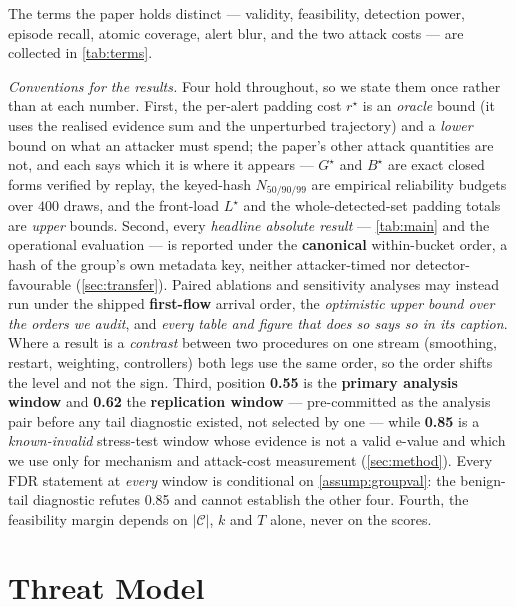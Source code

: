 \documentclass[conference]{IEEEtran}
\newcommand{\Cal}{\mathcal{C}}
\newcommand{\nCal}{\lvert\Cal\rvert}
\newcommand{\FDR}{\mathrm{FDR}}
\begin{document}
The terms the paper holds distinct --- validity, feasibility, detection power, episode
recall, atomic coverage, alert blur, and the two attack costs --- are collected in \cref{tab:terms}.

\emph{Conventions for the results.} Four hold throughout, so we state them once rather than at each
number. First, the per-alert padding cost $r^{\star}$ is an \emph{oracle} bound (it uses the realised
evidence sum and the unperturbed trajectory) and a \emph{lower} bound on what an attacker must spend;
the paper's other attack quantities are not, and each says which it is where it appears --- $G^{\star}$
and $B^{\star}$ are exact closed forms verified by replay, the keyed-hash $N_{50/90/99}$ are empirical
reliability budgets over $400$ draws, and the front-load $L^{\star}$ and the whole-detected-set padding
totals are \emph{upper} bounds. Second, every \emph{headline
absolute result} --- \cref{tab:main} and the operational evaluation --- is reported under the
\textbf{canonical} within-bucket order, a hash of the group's own metadata key, neither attacker-timed
nor detector-favourable (\cref{sec:transfer}). Paired ablations and sensitivity analyses may instead
run under the shipped \textbf{first-flow} arrival order, the \emph{optimistic upper bound over the
orders we audit}, and \emph{every table and figure that does so says so in its caption}. Where a
result is a \emph{contrast} between two procedures on one stream (smoothing, restart, weighting,
controllers) both legs use the same order, so the order shifts the level and not the sign. Third, position \textbf{0.55} is the \textbf{primary analysis window} and \textbf{0.62} the
\textbf{replication window} --- pre-committed as the analysis pair before any tail diagnostic existed,
not selected by one --- while \textbf{0.85} is a \emph{known-invalid} stress-test window whose evidence
is not a valid e-value and which we use only for mechanism and attack-cost measurement
(\cref{sec:method}). Every $\FDR$ statement at \emph{every} window is conditional on
\cref{assump:groupval}: the benign-tail diagnostic refutes 0.85 and cannot establish the other four. Fourth, the feasibility margin depends on $\nCal$, $k$ and $T$ alone, never on the
scores.

\section{Threat Model}\label{sec:threat}
\end{document}
